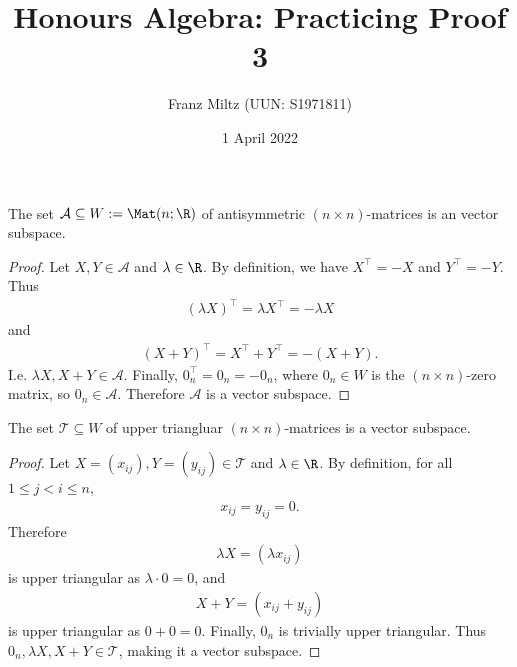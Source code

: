 \documentclass{article}
\begin{document}
\title{Honours Algebra: Practicing Proof 3}
\author{Franz Miltz (UUN: S1971811)}
\date{1 April 2022}
\maketitle
\begin{claim*}[1a]
	The set $\mathcal{A}\subseteq W:=\Mat(n;\R)$ of antisymmetric $(n\times n)$-matrices is an
	vector subspace.
	\begin{proof}
		Let $X,Y\in\mathcal{A}$ and $\lambda\in\R$. By definition, we have $X^\top=-X$ and $Y^\top=-Y$.
		Thus
		\begin{align*}
			(\lambda X)^\top = \lambda X^\top = -\lambda X
		\end{align*}
		and
		\begin{align*}
			(X+Y)^\top = X^\top + Y^\top = -(X+Y).
		\end{align*}
		I.e. $\lambda X,X+Y\in\mathcal{A}$. Finally, $0_n^\top = 0_n = -0_n$, where $0_n\in W$
		is the $(n\times n)$-zero matrix, so $0_n\in\mathcal{A}$. Therefore $\mathcal{A}$ is a vector subspace.
	\end{proof}
\end{claim*}
\begin{claim*}[1a]
	The set $\mathcal{T}\subseteq W$ of upper triangluar $(n\times n)$-matrices is a vector subspace.
	\begin{proof}
		Let $X=(x_{ij}),Y=(y_{ij})\in\mathcal{T}$ and $\lambda\in\R$. By definition, for all $1\leq j<i\leq n$,
		\begin{align*}
			x_{ij}=y_{ij}=0.
		\end{align*}
		Therefore
		\begin{align*}
			\lambda X=(\lambda x_{ij})
		\end{align*}
		is upper triangular as $\lambda\cdot 0=0$, and
		\begin{align*}
			X + Y =(x_{ij}+y_{ij})
		\end{align*}
		is upper triangular as $0+0=0$. Finally, $0_n$ is trivially upper triangular. Thus $0_n,\lambda X,X+Y\in\mathcal{T}$,
		making it a vector subspace.
	\end{proof}
\end{claim*}
\end{document}
